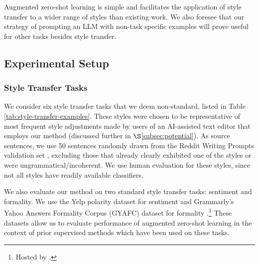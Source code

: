Augmented zero-shot learning is simple and facilitates the application of style transfer to a wider range of styles than existing work.
We also foresee that our strategy of prompting an LLM with non-task specific examples will prove useful for other tasks besides style transfer.

\subsection{Experimental Setup}


\subsubsection{Style Transfer Tasks}
We consider six style transfer tasks that we deem non-standard, listed in Table \ref{tab:style-transfer-examples}.
These styles were chosen to be representative of most frequent style adjustments made by users of an AI-assisted text editor that employs our method (discussed further in $\S$\ref{subsec:potential}). 
As source sentences, we use 50 sentences randomly drawn from the Reddit Writing Prompts validation set \citep{fan2018hierarchical}, excluding those that already clearly exhibited one of the styles or were ungrammatical/incoherent.
We use human evaluation for these styles, since not all styles have readily available classifiers.

We also evaluate our method on two standard style transfer tasks: sentiment and formality.
We use the Yelp polarity dataset \citep{zhangCharacterlevelConvolutionalNetworks2015} for sentiment and Grammarly's Yahoo Answers Formality Corpus (GYAFC) dataset for formality \citep{rao-tetreault-2018-dear}.\footnote{Hosted by \citet{DBLP:conf/ijcai/LuoLZYCSS19}.}
These datasets allow us to evaluate performance of augmented zero-shot learning in the context of prior supervised methods which have been used on these tasks.

